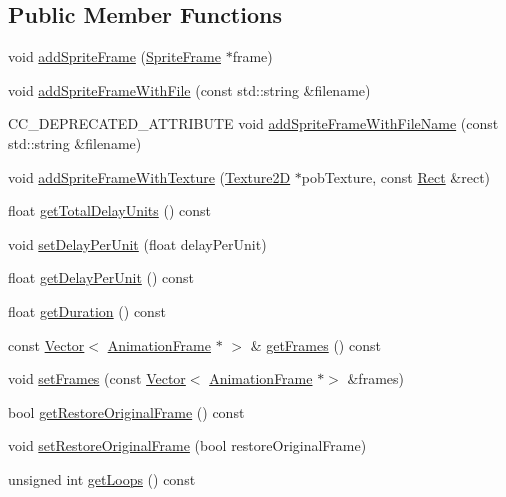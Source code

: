 \subsection*{Public Member Functions}
\begin{DoxyCompactItemize}
\item 
void \hyperlink{classAnimation_a560fb49ea8765f6a13ebb272effbc7cb}{add\+Sprite\+Frame} (\hyperlink{classSpriteFrame}{Sprite\+Frame} $\ast$frame)
\item 
void \hyperlink{classAnimation_ab57ae7ddaf2adca5d944d931e892d203}{add\+Sprite\+Frame\+With\+File} (const std\+::string \&filename)
\item 
C\+C\+\_\+\+D\+E\+P\+R\+E\+C\+A\+T\+E\+D\+\_\+\+A\+T\+T\+R\+I\+B\+U\+TE void \hyperlink{classAnimation_a26bbe80cf512690329b5c50f7dc567e8}{add\+Sprite\+Frame\+With\+File\+Name} (const std\+::string \&filename)
\item 
void \hyperlink{classAnimation_aae5886a21a9c86e88269e35aa58a7ab1}{add\+Sprite\+Frame\+With\+Texture} (\hyperlink{classTexture2D}{Texture2D} $\ast$pob\+Texture, const \hyperlink{classRect}{Rect} \&rect)
\item 
float \hyperlink{classAnimation_aa40cf40bf964a9acb74573e385a23f2f}{get\+Total\+Delay\+Units} () const
\item 
void \hyperlink{classAnimation_aac13966b350fe6f9d93dddfc3d65f9b7}{set\+Delay\+Per\+Unit} (float delay\+Per\+Unit)
\item 
float \hyperlink{classAnimation_a8bd8ce2036c1772a387a23fb35f78254}{get\+Delay\+Per\+Unit} () const
\item 
float \hyperlink{classAnimation_aa2cd2d5b8e2e6a8d6a2366556e29b03f}{get\+Duration} () const
\item 
const \hyperlink{classVector}{Vector}$<$ \hyperlink{classAnimationFrame}{Animation\+Frame} $\ast$ $>$ \& \hyperlink{classAnimation_a0f750cb26248e179ab8791c0bbb78057}{get\+Frames} () const
\item 
void \hyperlink{classAnimation_a2b083139529c667cc85d961e9ce4e49c}{set\+Frames} (const \hyperlink{classVector}{Vector}$<$ \hyperlink{classAnimationFrame}{Animation\+Frame} $\ast$$>$ \&frames)
\item 
bool \hyperlink{classAnimation_ac64dc1dd9ea5a78368906544d3404718}{get\+Restore\+Original\+Frame} () const
\item 
void \hyperlink{classAnimation_aeee2ac2f17c63415f5b34c9546824cde}{set\+Restore\+Original\+Frame} (bool restore\+Original\+Frame)
\item 
unsigned int \hyperlink{classAnimation_a8d7832e8872f8c7ae4c6c63181506da3}{get\+Loops} () const
$$
\end{DoxyCompactItemize}
